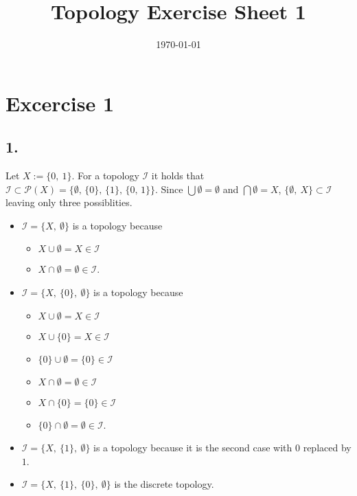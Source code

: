 \documentclass{article}
\title{Topology Exercise Sheet 1}
\date{\today}
\begin{document}
\maketitle

\section*{Excercise 1}
\label{sec:Ex1}
\subsection*{1.}
Let $X := \{0,\ 1\}$.
For a topology $\mathcal{I}$ it holds that $\mathcal{I} \subset{\mathcal{P}(X)} = \{ \emptyset ,\, \{0\} ,\, \{1\} ,\, \{0,\, 1\}\}$.
Since $\bigcup \emptyset = \emptyset$ and $\bigcap \emptyset = X$, $\{ \emptyset ,\ X \} \subset \mathcal{I}$ leaving only three possiblities.
\begin{itemize}
\item $\mathcal{I} = \{X ,\ \emptyset \}$ is a topology because
  \begin{itemize}
  \item $X \cup \emptyset = X \in \mathcal{I}$
  \item $X \cap \emptyset = \emptyset \in \mathcal{I}$.
  \end{itemize}
\item $\mathcal{I} = \{X ,\ \{0\} ,\ \emptyset\}$ is a topology because
  \begin{itemize}
  \item $X \cup \emptyset = X \in \mathcal{I}$
  \item $X \cup \{0\} = X \in \mathcal{I}$
  \item $\{0\} \cup \emptyset = \{0\} \in \mathcal{I}$
  \item $X \cap \emptyset = \emptyset \in \mathcal{I}$
  \item $X \cap \{0\} = \{0\} \in \mathcal{I}$
  \item $\{0\} \cap \emptyset = \emptyset \in \mathcal{I}$.
  \end{itemize}
\item $\mathcal{I} = \{X ,\ \{1\} ,\ \emptyset\}$ is a topology because it is the second case with $0$ replaced by $1$.
\item $\mathcal{I} = \{X ,\ \{1\} ,\ \{0\} ,\ \emptyset\}$ is the discrete topology.
\end{itemize}
\end{document}
